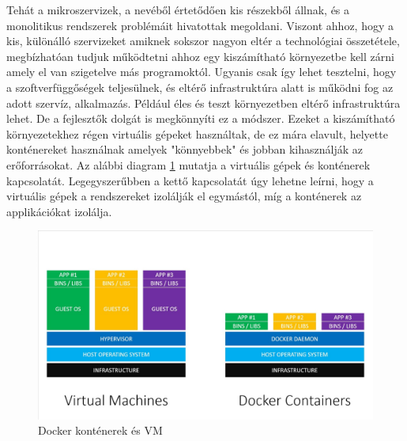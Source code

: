 Tehát a mikroszervizek, a nevéből értetődően kis részekből állnak, és a monolitikus rendszerek problémáit hivatottak megoldani.
Viszont ahhoz, hogy a kis, különálló szervizeket amiknek sokszor nagyon eltér a technológiai összetétele, megbízhatóan tudjuk működtetni ahhoz egy kiszámítható környezetbe kell zárni amely el van szigetelve más programoktól.
Ugyanis csak így lehet tesztelni, hogy a szoftverfüggőségek teljesülnek, és eltérő infrastruktúra alatt is működni fog az adott szervíz, alkalmazás.
Például éles és teszt környezetben eltérő infrastruktúra lehet.
De a fejlesztők dolgát is megkönnyíti ez a módszer.
Ezeket a kiszámítható környezetekhez régen virtuális gépeket használtak, de ez mára elavult, helyette konténereket használnak amelyek "könnyebbek" és jobban kihasználják az erőforrásokat.
Az alábbi diagram \ref{fig:docker-vm} mutatja a virtuális gépek és konténerek kapcsolatát.
Legegyszerűbben a kettő kapcsolatát úgy lehetne leírni, hogy a virtuális gépek a rendszereket izolálják el egymástól, míg a konténerek az applikációkat izolálja.

\begin{figure}
    \centering
    \includegraphics[scale=0.3]{images/docker-vs-vms.jpg}
    \caption{Docker konténerek és VM \cite{janetakis}}
    \label{fig:docker-vm}
\end{figure}


